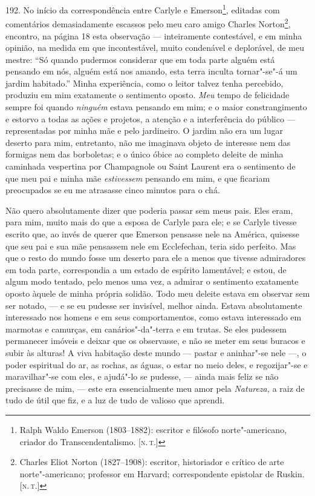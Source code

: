 192. No início da correspondência entre Carlyle e Emerson\footnote{Ralph
  Waldo Emerson (1803--1882): escritor e filósofo norte"-americano,
  criador do Transcendentalismo. {[}\textsc{n.\,t.}{]}}, editadas com
comentários demasiadamente escassos pelo meu caro amigo Charles
Norton\footnote{Charles Eliot Norton (1827--1908): escritor, historiador
  e crítico de arte norte"-americano; professor em Harvard;
  correspondente epistolar de Ruskin. {[}\textsc{n.\,t.}{]}}, encontro, na
página 18 esta observação --- inteiramente contestável, e em minha
opinião, na medida em que incontestável, muito condenável e deplorável,
de meu mestre: ``Só quando pudermos considerar que em toda parte alguém
está pensando em nós, alguém está nos amando, esta terra inculta
tornar"-se"-á um jardim habitado.'' Minha experiência, como o leitor
talvez tenha percebido, produziu em mim exatamente o sentimento oposto.
\emph{Meu} tempo de felicidade sempre foi quando \emph{ninguém} estava
pensando em mim; e o maior constrangimento e estorvo a todas as ações e
projetos, a atenção e a interferência do público --- representadas por
minha mãe e pelo jardineiro. O jardim não era um lugar deserto para mim,
entretanto, não me imaginava objeto de interesse nem das formigas nem
das borboletas; e o único óbice ao completo deleite de minha caminhada
vespertina por Champagnole ou Saint Laurent era o sentimento de que meu
pai e minha mãe \emph{estivessem} pensando em mim, e que ficariam
preocupados se eu me atrasasse cinco minutos para o chá.

Não quero absolutamente dizer que poderia passar sem meus pais. Eles
eram, para mim, muito mais do que a esposa de Carlyle para ele; e se
Carlyle tivesse escrito que, ao invés de querer que Emerson pensasse
nele na América, quisesse que seu pai e sua mãe pensassem nele em
Ecclefechan, teria sido perfeito. Mas que o resto do mundo fosse um
deserto para ele a menos que tivesse admiradores em toda parte,
correspondia a um estado de espírito lamentável; e estou, de algum modo
tentado, pelo menos uma vez, a admirar o sentimento exatamente oposto
àquele de minha própria solidão. Todo meu deleite estava em observar sem
ser notado, --- e se eu pudesse ser invisível, melhor ainda. Estava
absolutamente interessado nos homens e em seus comportamentos, como
estava interessado em marmotas e camurças, em canários"-da"-terra e em
trutas. Se eles pudessem permanecer imóveis e deixar que os observasse,
e não se meter em seus buracos e subir às alturas! A viva habitação
deste mundo --- pastar e aninhar"-se nele ---, o poder espiritual do ar, as
rochas, as águas, o estar no meio deles, e regozijar"-se e maravilhar"-se
com eles, e ajudá"-lo se pudesse, --- ainda mais feliz se não precisasse
de mim, --- este era essencialmente meu amor pela \emph{Natureza,} a raiz
de tudo de útil que fiz, e a luz de tudo de valioso que aprendi.

